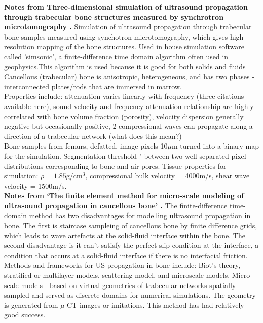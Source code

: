 \documentclass[11pt,titlepage]{article} %
\begin{document}
\textbf{Notes from Three-dimensional simulation of ultrasound propagation through trabecular bone structures measured by synchrotron microtomography \cite{bossy2005three}.}
Simulation of ultrasound propagation through trabecular bone samples measured using synchotron microtomography, which gives high resolution mapping of the bone structures.
Used in house simulation software called 'simsonic', a finite-difference time domain algorithm often used in geophysics.This algorithm is used because it is good for both solids and fluids \cite{graves1996simulating}\\
Cancellous (trabecular) bone is anisotropic, heterogeneous, and has two phases - interconnected plates/rods that are immersed in marrow. \\
Properties include: attenuation varies linearly with frequency (three citations available here), sound velocity and frequency-attenuation relationship are highly correlated with bone volume fraction (porosity), velocity dispersion generally negative but occasionally positive, 2 compressional waves can propagate along a direction of a trabecular network (what does this mean?)\\
Bone samples from femurs, defatted, image pixels 10$\mu$m turned into a binary map for the simulation. Segmentation threshold " between two well separated pixel distributions corresponding to bone and air pores. Tissue properties for simulation: $\rho = 1.85$g/cm$^3$, compressional bulk velocity = 4000m/s, shear wave velocity = 1500m/s.\\


\textbf{Notes from `The finite element method for micro-scale modeling of ultrasound propagation in cancellous bone' \cite{vafaeian2014finite}. }
The finite-difference time-domain method has two disadvantages for modelling ultrasound propagation in bone. The first is staircase sampleing of cancellous bone by finite difference grids, which leads to wave artefacts at the solid-fluid interface within the bone. The second disadvantage is it can't satisfy the perfect-slip condition at the interface, a condition that occurs at a solid-fluid interface if there is no interfacial friction. 
Methods and frameworks for US propagation in bone include: Biot's theory, stratified or multilayer models, scattering model, and microscale models. 
Micro-scale models - based on virtual geometries of trabecular networks spatially sampled and served as discrete domains for numerical simulations. The geometry is generated from $\mu$-CT images or imitations. This method has had relatively good success. 
\end{document}
